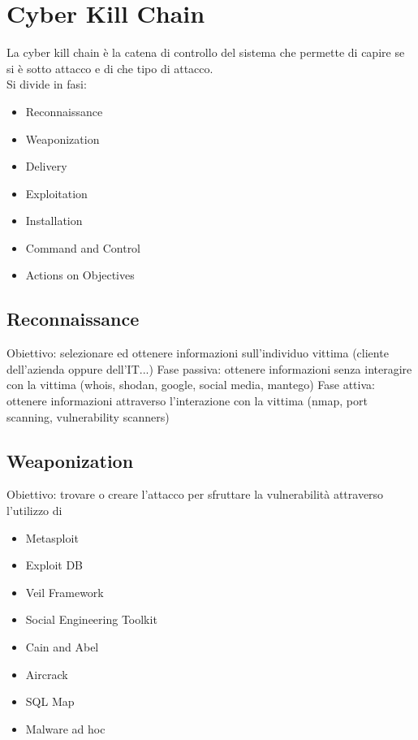 \section{Cyber Kill Chain}
\label{sec:cyberkillchain}
La cyber kill chain è la catena di controllo del sistema che permette di capire se si è sotto attacco e di che tipo di attacco.\\
Si divide in fasi:
\begin{itemize}[noitemsep]
    \item Reconnaissance
    \item Weaponization
    \item Delivery
    \item Exploitation
    \item Installation
    \item Command and Control
    \item Actions on Objectives
\end{itemize}


\subsection{Reconnaissance}
Obiettivo: selezionare ed ottenere informazioni sull'individuo vittima (cliente dell'azienda oppure dell'IT...)
Fase passiva: ottenere informazioni senza interagire con la vittima (whois, shodan, google, social media, mantego)
Fase attiva: ottenere informazioni attraverso l'interazione con la vittima (nmap, port scanning, vulnerability scanners)

\subsection{Weaponization}
Obiettivo: trovare o creare l'attacco per sfruttare la vulnerabilità attraverso l'utilizzo di
\begin{itemize}[noitemsep]
    \item Metasploit
    \item Exploit DB
    \item Veil Framework
    \item Social Engineering Toolkit
    \item Cain and Abel
    \item Aircrack
    \item SQL Map
    \item Malware ad hoc
\end{itemize}



